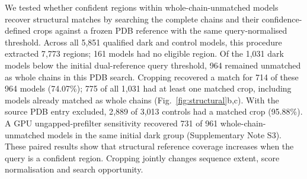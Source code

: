 We tested whether confident regions within whole-chain-unmatched models recover structural
matches by searching the complete chains and their confidence-defined crops against a frozen
PDB reference with the same query-normalised threshold. Across all 5{,}851 qualified dark and
control models, this procedure extracted 7{,}773 regions; 161 models had no eligible region.
Of the 1{,}031 dark models below the initial dual-reference query threshold, 964 remained
unmatched as whole chains in this PDB search. Cropping recovered a match for 714 of these
964 models (74.07\%); 775 of all 1{,}031 had at least one matched crop, including models already
matched as whole chains (Fig.~\ref{fig:structural}b,c). With the source PDB entry excluded,
2{,}889 of 3{,}013 controls had a matched crop (95.88\%). A GPU ungapped-prefilter sensitivity
recovered 731 of 961 whole-chain-unmatched models in the same initial dark group
(Supplementary Note S3). These paired results show that structural reference coverage increases
when the query is a confident region. Cropping jointly changes sequence extent, score
normalisation and search opportunity.

